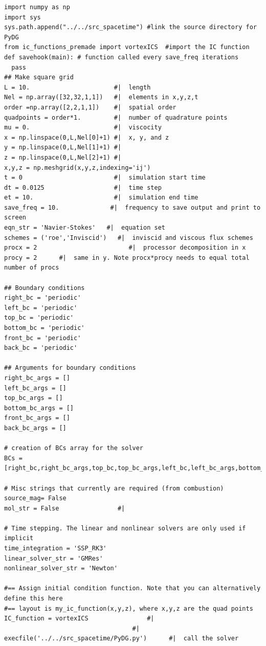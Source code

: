 \documentclass[times,12pt]{article}%
\begin{document}
\begin{lstlisting}
import numpy as np
import sys
sys.path.append("../../src_spacetime") #link the source directory for PyDG
from ic_functions_premade import vortexICS  #import the IC function
def savehook(main): # function called every save_freq iterations
  pass
## Make square grid
L = 10.                       #|  length
Nel = np.array([32,32,1,1])   #|  elements in x,y,z,t
order =np.array([2,2,1,1])    #|  spatial order
quadpoints = order*1.         #|  number of quadrature points
mu = 0.                       #|  viscocity
x = np.linspace(0,L,Nel[0]+1) #|  x, y, and z
y = np.linspace(0,L,Nel[1]+1) #|
z = np.linspace(0,L,Nel[2]+1) #|
x,y,z = np.meshgrid(x,y,z,indexing='ij')
t = 0                         #|  simulation start time
dt = 0.0125                   #|  time step
et = 10.                      #|  simulation end time
save_freq = 10.              #|  frequency to save output and print to screen
eqn_str = 'Navier-Stokes'   #|  equation set
schemes = ('roe','Inviscid')   #|  inviscid and viscous flux schemes
procx = 2                         #|  processor decomposition in x
procy = 2      #|  same in y. Note procx*procy needs to equal total number of procs

## Boundary conditions
right_bc = 'periodic' 
left_bc = 'periodic'
top_bc = 'periodic'
bottom_bc = 'periodic'
front_bc = 'periodic'
back_bc = 'periodic'

## Arguments for boundary conditions
right_bc_args = []
left_bc_args = []
top_bc_args = []
bottom_bc_args = []
front_bc_args = []
back_bc_args = []

# creation of BCs array for the solver
BCs = [right_bc,right_bc_args,top_bc,top_bc_args,left_bc,left_bc_args,bottom_bc,bottom_bc_args,front_bc,front_bc_args,back_bc,back_bc_args]

# Misc strings that currently are required (from combustion)
source_mag= False
mol_str = False				   #|

# Time stepping. The linear and nonlinear solvers are only used if implicit
time_integration = 'SSP_RK3'
linear_solver_str = 'GMRes'
nonlinear_solver_str = 'Newton'

#== Assign initial condition function. Note that you can alternatively define this here
#== layout is my_ic_function(x,y,z), where x,y,z are the quad points
IC_function = vortexICS                #|
                                   #|
execfile('../../src_spacetime/PyDG.py')      #|  call the solver
\end{lstlisting}
\end{document}

